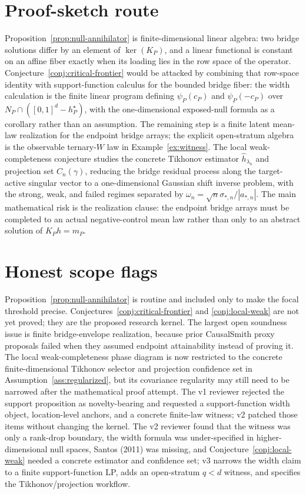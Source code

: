 \documentclass[11pt]{article}
\theoremstyle{definition}
\theoremstyle{plain}
\theoremstyle{remark}
\begin{document}
\section{Proof-sketch route}
Proposition~\ref{prop:null-annihilator} is finite-dimensional linear algebra:
two bridge solutions differ by an element of \(\ker(K_P)\), and a linear
functional is constant on an affine fiber exactly when its loading lies in the
row space of the operator.  Conjecture~\ref{conj:critical-frontier} would be
attacked by combining that row-space identity with support-function calculus
for the bounded bridge fiber: the width calculation is the finite linear
program defining \(\psi_P(c_P)\) and \(\psi_P(-c_P)\) over
\(N_P\cap([0,1]^d-h_P^\star)\), with the one-dimensional exposed-null formula
as a corollary rather than an assumption.  The remaining step is a finite
latent mean-law realization for the endpoint bridge arrays; the explicit
open-stratum algebra is the observable ternary-\(W\) law in
Example~\ref{ex:witness}.  The local weak-completeness conjecture studies the
concrete Tikhonov estimator \(\widehat h_{\lambda_n}\) and projection set
\(C_n(\gamma)\), reducing the bridge residual process along the target-active
singular vector to a one-dimensional Gaussian shift inverse problem, with the
strong, weak, and failed regimes separated by
\(\omega_n=\sqrt{n}\sigma_{*,n}/|a_{*,n}|\).  The main mathematical risk is the
realization clause: the endpoint bridge arrays must be completed to an actual
negative-control mean law rather than only to an abstract solution of
\(K_Ph=m_P\).

\section{Honest scope flags}
Proposition~\ref{prop:null-annihilator} is routine and included only to make the
focal threshold precise.  Conjectures~\ref{conj:critical-frontier} and
\ref{conj:local-weak} are not yet proved; they are the proposed research
kernel.  The largest open soundness issue is finite bridge-envelope
realization, because prior CausalSmith proxy proposals failed when they assumed
endpoint attainability instead of proving it.  The local weak-completeness
phase diagram is now restricted to the concrete finite-dimensional Tikhonov
selector and projection confidence set in Assumption~\ref{ass:regularized}, but
its covariance regularity may still need to be narrowed after the mathematical
proof attempt.  The v1 reviewer rejected the support proposition as
novelty-bearing and requested a support-function width object, location-level
anchors, and a concrete finite-law witness; v2 patched those items without
changing the kernel.  The v2 reviewer found that the witness was only a
rank-drop boundary, the width formula was under-specified in higher-dimensional
null spaces, Santos (2011) was missing, and Conjecture~\ref{conj:local-weak}
needed a concrete estimator and confidence set; v3 narrows the width claim to a
finite support-function LP, adds an open-stratum \(q<d\) witness, and specifies
the Tikhonov/projection workflow.
\end{document}
